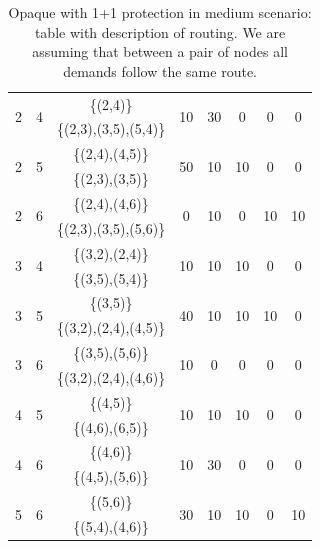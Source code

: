 \begin{table}[h!]
\begin{tabular}{|| c | c | c | c | c | c | c | c ||}
 \multirow{2}{*}{2} & \multirow{2}{*}{4} & \{(2,4)\} & \multirow{2}{*}{10} & \multirow{2}{*}{30} & \multirow{2}{*}{0} & \multirow{2}{*}{0} & \multirow{2}{*}{0}\\
 & & \{(2,3),(3,5),(5,4)\} & & & & &\\ \hline
 \multirow{2}{*}{2} & \multirow{2}{*}{5} & \{(2,4),(4,5)\} & \multirow{2}{*}{50} & \multirow{2}{*}{10} & \multirow{2}{*}{10} & \multirow{2}{*}{0} & \multirow{2}{*}{0}\\
 & & \{(2,3),(3,5)\} & & & & &\\ \hline
 \multirow{2}{*}{2} & \multirow{2}{*}{6} & \{(2,4),(4,6)\} & \multirow{2}{*}{0} & \multirow{2}{*}{10} & \multirow{2}{*}{0} & \multirow{2}{*}{10} & \multirow{2}{*}{10}\\
 & & \{(2,3),(3,5),(5,6)\} & & & & &\\ \hline
 \multirow{2}{*}{3} & \multirow{2}{*}{4} & \{(3,2),(2,4)\} & \multirow{2}{*}{10} & \multirow{2}{*}{10} & \multirow{2}{*}{10} & \multirow{2}{*}{0} & \multirow{2}{*}{0}\\
 & & \{(3,5),(5,4)\} & & & & &\\ \hline
 \multirow{2}{*}{3} & \multirow{2}{*}{5} & \{(3,5)\} & \multirow{2}{*}{40} & \multirow{2}{*}{10} & \multirow{2}{*}{10} & \multirow{2}{*}{10} & \multirow{2}{*}{0}\\
 & & \{(3,2),(2,4),(4,5)\} & & & & &\\ \hline
 \multirow{2}{*}{3} & \multirow{2}{*}{6} & \{(3,5),(5,6)\} & \multirow{2}{*}{10} & \multirow{2}{*}{0} & \multirow{2}{*}{0} & \multirow{2}{*}{0} & \multirow{2}{*}{0}\\
 & & \{(3,2),(2,4),(4,6)\} & & & & &\\ \hline
 \multirow{2}{*}{4} & \multirow{2}{*}{5} & \{(4,5)\} & \multirow{2}{*}{10} & \multirow{2}{*}{10} & \multirow{2}{*}{10} & \multirow{2}{*}{0} & \multirow{2}{*}{0}\\
 & & \{(4,6),(6,5)\} & & & & &\\ \hline
 \multirow{2}{*}{4} & \multirow{2}{*}{6} & \{(4,6)\} & \multirow{2}{*}{10} & \multirow{2}{*}{30} & \multirow{2}{*}{0} & \multirow{2}{*}{0} & \multirow{2}{*}{0}\\
 & & \{(4,5),(5,6)\} & & & & &\\ \hline
 \multirow{2}{*}{5} & \multirow{2}{*}{6} & \{(5,6)\} & \multirow{2}{*}{30} & \multirow{2}{*}{10} & \multirow{2}{*}{10} & \multirow{2}{*}{0} & \multirow{2}{*}{10}\\
 & & \{(5,4),(4,6)\} & & & & &\\
 \hline
\end{tabular}
\caption{Opaque with 1+1 protection in medium scenario: table with description of routing. We are assuming that between a pair of nodes all demands follow the same route.}
\label{path_opaque_protec_ref_medium}
\end{table}

